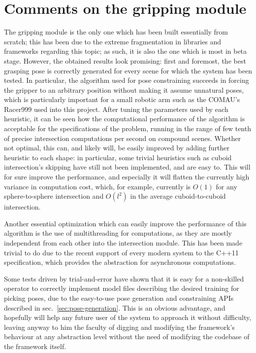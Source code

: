 \section{Comments on the gripping module}
The gripping module is the only one which has been built essentially from scratch;
this has been due to the extreme fragmentation in libraries and
frameworks regarding this topic; as such, it is also the one which is
most in beta stage. However, the obtained results look promising:
first and foremost, the best grasping pose is correctly generated for
every scene for which the system has been tested. In particular, the
algorithm used for pose constraining succeeds in forcing the gripper to
an arbitrary position without making it assume unnatural poses, which
is particularly important for a small robotic arm such as the COMAU's
Racer999 used into this project.
After tuning the parameters used by each heuristic, it can be seen how
the computational performance of the algorithm is acceptable for the
specifications of the problem, running in the range of few tenth of
precise intersection computations per second on compound
scenes. Whether not optimal, this can, and likely will, be easily
improved by adding further heuristic to each shape: in particular,
some trivial heuristics such as cuboid intersection's skipping have
still not been implemented, and are easy to. This will for sure
improve the performance, and especially it will flatten the currently
high variance in computation cost, which, for example, currently is
$O(1)$ for any sphere-to-sphere intersection and $O(l^2)$ in the
average cuboid-to-cuboid intersection.

Another essential optimization which can easily improve the
performance of this algorithm is the use of multithreading for
computations, as they are mostly independent from each other into the
intersection module. This has been made trivial to do due to the
recent support of every modern system to the C++11 specification,
which provides the  abstraction for asynchronous computations.

Some tests driven by trial-and-error have shown that it is easy for a
non-skilled operator to correctly implement model files describing the
desired training for picking poses, due to the easy-to-use pose
generation and constraining APIs described in
sec.~\ref{sec:pose-generation}. This is an obvious advantage, and
hopefully will help any future user of the system to approach it
without difficulty, leaving anyway to him the faculty of digging and
modifying the framework's behaviour at any abstraction level without
the need of modifying the codebase of the framework itself.

